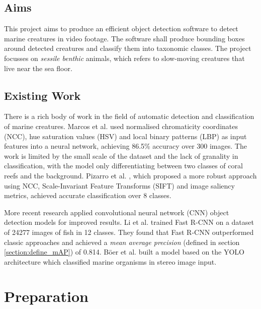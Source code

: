 \documentclass[12pt,a4paper,twoside,openany]{report}
\begin{document}
\section{Aims}
This project aims to produce an efficient object detection software to detect marine creatures in video footage. The software shall produce bounding boxes around detected creatures and classify them into taxonomic classes. The project focusses on \textit{sessile benthic} animals, which refers to slow-moving creatures that live near the sea floor. 

\section{Existing Work}
There is a rich body of work in the field of automatic detection and classification of marine creatures. Marcos et al. \cite{marcos_classification_2005} used normalised chromaticity coordinates (NCC), hue saturation values (HSV) and local binary patterns (LBP) as input features into a neural network, achieving 86.5\% accuracy over 300 images. The work is limited by the small scale of the dataset and the lack of granality in classification, with the model only differentiating between two classes of coral reefs and the background. Pizarro et al. \cite{pizarro_towards_2008}, which proposed a more robust approach using NCC, Scale-Invariant Feature Transforms (SIFT) and image saliency metrics, achieved accurate classification over 8 classes.

More recent research applied convolutional neural network (CNN) object detection models for improved results. Li et al. \cite{li_fast_2015} trained Fast R-CNN \cite{girshick_fast_2015} on a dataset of 24277 images of fish in 12 classes. They found that Fast R-CNN outperformed classic approaches and achieved a \textit{mean average precision} (defined in section \ref{section:define_mAP}) of 0.814. Böer et al. \cite{boer_deep-learning_2023} built a model based on the YOLO \cite{redmon_you_2016} architecture which classified marine organisms in stereo image input. 

\chapter{Preparation}
\end{document}

